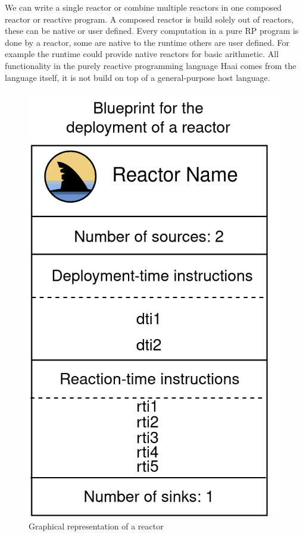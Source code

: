 \documentclass[a4paper]{book}
\begin{document}
We can write a single reactor or combine multiple reactors in one composed reactor or reactive program. A composed reactor is build solely out of reactors, these can be native or user defined. Every computation in a pure RP program is done by a reactor, some are native to the runtime others are user defined. For example the runtime could provide native reactors for basic arithmetic. All functionality in the purely reactive programming language Haai comes from the language itself, it is not build on top of a general-purpose host language. 

\begin{figure}[h]
	\includegraphics[scale=0.2]{reactor300.drawio}
	\centering
	\caption{Graphical representation of a reactor}
	\label{fig:reactor}
\end{figure}
\end{document}
